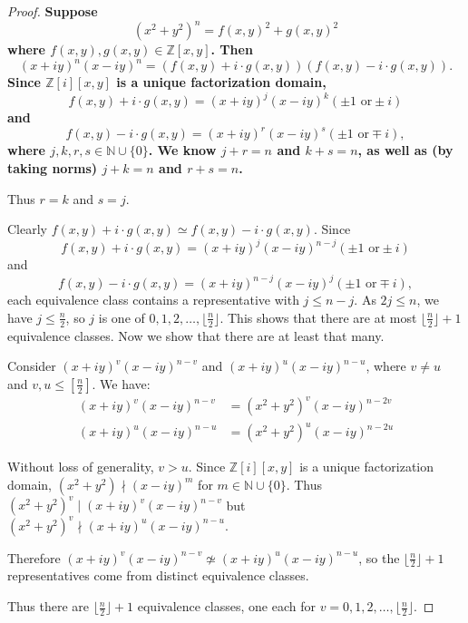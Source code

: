 \documentclass[12pt]{article}
\theoremstyle{definition}
\newcommand{\divides}{\mid}
\newcommand{\notdivides}{\nmid}
\numberwithin{equation}{section}
\begin{document}
\begin{proof}
\bf
Suppose 
\[ (x^2 + y^2)^n = f(x,y)^2 + g(x,y)^2 \]
where \( f(x,y), g(x,y) \in \mathbb{Z}[x,y] \).
Then  
\[ (x + iy)^n (x -  iy)^n = ( f(x,y) + i \cdot g(x,y) ) ( f(x,y) - i \cdot g(x,y) ) .\]
Since \( \mathbb{Z} [i][x,y] \) is a unique factorization domain, 
\[ f(x,y) + i \cdot g(x,y) = (x + iy)^j (x -  iy)^k ( \pm 1 \text{ or} \pm i ) \]
and
\[ f(x,y) - i \cdot g(x,y) = (x + iy)^r (x -  iy)^s ( \pm 1 \text{ or} \mp i ), \]
where \( j, k, r, s \in \mathbb{N} \cup \{0\} \). 
We know \( j + r = n \) and \( k + s = n \), as well as (by taking norms) \( j + k = n \) and \( r + s = n \).

Thus \(r = k\) and \(s = j\).

Clearly \( f(x,y) + i \cdot g(x,y) \simeq  f(x,y) - i \cdot g(x,y) \).
Since 
\[ 
f(x,y) + i \cdot g(x,y) = (x + iy)^j (x -  iy)^{n-j} ( \pm 1 \text{ or} \pm i ) 
\]
and 
\[ 
f(x,y) - i \cdot g(x,y) = (x + iy)^{n-j} (x -  iy)^j ( \pm 1 \text{ or} \mp i ) ,
\]
each equivalence class contains a representative with \( j \leq n - j
\).  As \( 2j \leq n \), we have \( j \leq \frac{n}{2} \), so \( j \)
is one of \( 0, 1, 2, \ldots, \lfloor \frac{n}{2} \rfloor \). This shows
that there are at most \( \lfloor \frac{n}{2} \rfloor + 1 \)
equivalence classes. Now we show that there are at least that many.



Consider \( (x + iy)^v (x -  iy)^{n-v} \)  and \( (x + iy)^u (x -  iy)^{n-u} \),
where \( v \neq u \) and \(v,u \leq [ \frac{n}{2} ] \). We have:
\begin{align*}
(x + iy)^v (x -  iy)^{n-v} &= (x^2 + y^2)^v (x -  iy)^{n-2v}
\\
(x + iy)^u (x -  iy)^{n-u} &= (x^2 + y^2)^u (x -  iy)^{n-2u}
\end{align*}

Without loss of generality, \( v > u \). 
Since \( \mathbb{Z} [i][x,y] \) is a unique factorization domain,
\( (x^2 + y^2) \notdivides (x -  iy)^m \) for \( m \in \mathbb{N} \cup \{ 0 \} \).
Thus \( (x^2 + y^2)^v \divides (x + iy)^v (x -  iy)^{n-v} \)
but \( (x^2 + y^2)^v \notdivides (x + iy)^u (x -  iy)^{n-u} \).

Therefore \( (x + iy)^v (x -  iy)^{n-v} \not\simeq (x + iy)^u (x -  iy)^{n-u} \), 
so the \( \lfloor \frac{n}{2} \rfloor + 1 \) representatives come from
distinct equivalence classes.

Thus there are \( \lfloor \frac{n}{2} \rfloor + 1 \) equivalence classes, 
one each for \( v = 0, 1, 2, \ldots,  \lfloor \frac{n}{2} \rfloor \).
\end{proof}
\end{document}
